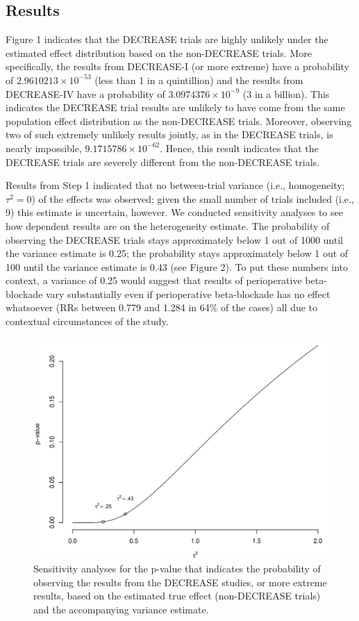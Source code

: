\documentclass[]{article}
\begin{document}
\subsection{Results}\label{results-1}

Figure 1 indicates that the DECREASE trials are highly unlikely under
the estimated effect distribution based on the non-DECREASE trials. More
specifically, the results from DECREASE-I (or more extreme) have a
probability of \(2.9610213\times 10^{-53}\) (less than 1 in a
quintillion) and the results from DECREASE-IV have a probability of
\(3.0974376\times 10^{-9}\) (3 in a billion). This indicates the
DECREASE trial results are unlikely to have come from the same
population effect distribution as the non-DECREASE trials. Moreover,
observing two of such extremely unlikely results jointly, as in the
DECREASE trials, is nearly impossible, \(9.1715786\times 10^{-62}\).
Hence, this result indicates that the DECREASE trials are severely
different from the non-DECREASE trials.

Results from Step 1 indicated that no between-trial variance (i.e.,
homogeneity; \(\tau^2=0\)) of the effects was observed; given the small
number of trials included (i.e., 9) this estimate is uncertain, however.
We conducted sensitivity analyses to see how dependent results are on
the heterogeneity estimate. The probability of observing the DECREASE
trials stays approximately below 1 out of 1000 until the variance
estimate is 0.25; the probability stays approximately below 1 out of 100
until the variance estimate is 0.43 (see Figure 2). To put these numbers
into context, a variance of 0.25 would suggest that results of
perioperative beta-blockade vary substantially even if perioperative
beta-blockade has no effect whatsoever (RRs between 0.779 and 1.284 in
64\% of the cases) all due to contextual circumstances of the study.

\begin{figure}

{\centering \includegraphics[width=0.8\linewidth]{../figures/fig2} 

}

\caption{Sensitivity analyses for the p-value that indicates the probability of observing the results from the DECREASE studies, or more extreme results, based on the estimated true effect (non-DECREASE trials) and the accompanying variance estimate.}\label{fig:figure 2}
\end{figure}
\end{document}
